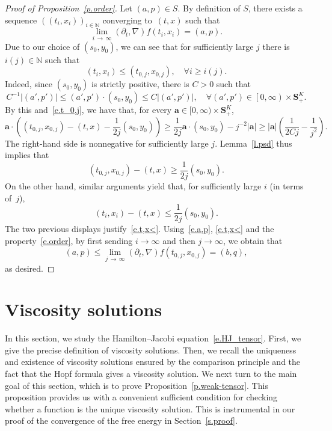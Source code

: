 \documentclass[10pt]{amsart}
\theoremstyle{definition}\newtheorem{defi}[theo]{Definition}\newtheorem{rema}[theo]{Remark}\newtheorem{exam}[theo]{Example}\newtheorem{exem}[theo]{Example}\newtheorem{nota}[theo]{Notation}
\newcommand{\N}{\mathbb{N}}
\renewcommand{\S}{\mathbf{S}}
\newcommand{\bfa}{\mathbf{a}}
\renewcommand{\leq}{\leqslant}
\renewcommand{\geq}{\geqslant}
\let\oldforall\forall
\renewcommand*{\forall}{\mathrel{\oldforall}}
\begin{document}
\begin{proof}[Proof of Proposition~\ref{p.order}]
Let $(a,p)\in S$. By definition of $S$, there exists a sequence $((t_i,x_i))_{i\in\N}$ converging to~$(t,x)$ such that
\begin{equation}\label{e.a,p}
\lim_{i\,\to\,\infty} \left(\partial_t,\nabla\right)f\left(t_i,x_i\right) = (a,p).
\end{equation}
Due to our choice of $(s_0,y_0)$, we can see that for sufficiently large $j$ there is $i(j)\in\N $ such that
\begin{equation}\label{e.t,x<}
(t_i,x_i)\leq \left(t_{0,j},x_{0,j}\right),\quad\forall i\geq i(j).
\end{equation}
Indeed, since $(s_0,y_0)$ is strictly positive, there is $C>0$ such that
\[
C^{-1}\left|\left(a',p'\right)\right|\leq \left(a',p'\right)\cdot \left(s_0,y_0\right)\leq C\left|\left(a',p'\right)\right|,\quad\forall \left(a',p'\right)\in\left[0,\infty\right)\times\S^K_+.
\]
By this and~\eqref{e.t_0,j}, we have that, for every $\bfa\in[0,\infty)\times\S^K_+$,
\[
\bfa\cdot\left(\left(t_{0,j},x_{0,j}\right)-(t,x) - \frac{1}{2j}(s_0,y_0)\right)\geq \frac{1}{2j}\bfa\cdot\left(s_0,y_0\right) - j^{-2}|\bfa|\geq |\bfa|\left(\frac{1}{2Cj}-\frac{1}{j^2}\right).
\]
The right-hand side is nonnegative for sufficiently large $j$. Lemma~\ref{l.psd} thus implies that
\[
\left(t_{0,j},x_{0,j}\right)-(t,x)\geq \frac{1}{2j}\left(s_0,y_0\right).
\]
On the other hand, similar arguments yield that, for sufficiently large $i$ (in terms of~$j$),
\[
\left(t_i,x_i\right)-(t,x) \leq \frac{1}{2j}\left(s_0,y_0\right).
\]
The two previous displays justify~\eqref{e.t,x<}. Using~\eqref{e.a,p}, \eqref{e.t,x<} and the property~\eqref{e.order}, by first sending $i\to\infty$ and then $j\to\infty$, we obtain that
\[
(a,p)\leq \lim_{j\,\to\,\infty}\left(\partial_t,\nabla\right)f\left(t_{0,j},x_{0,j}\right)=(b,q),
\]
as desired.
\end{proof}



\section{Viscosity solutions}\label{s.hj}

In this section, we study the Hamilton--Jacobi equation~\eqref{e.HJ_tensor}. First, we give the precise definition of viscosity solutions. Then, we recall the uniqueness and existence of viscosity solutions ensured by the comparison principle and the fact that the Hopf formula gives a viscosity solution. We next turn to the main goal of this section, which is to prove Proposition~\ref{p.weak-tensor}. This proposition provides us with a convenient sufficient condition for checking whether a function is the unique viscosity solution. This is instrumental in our proof of the convergence of the free energy in Section~\ref{s.proof}.
\end{document}

